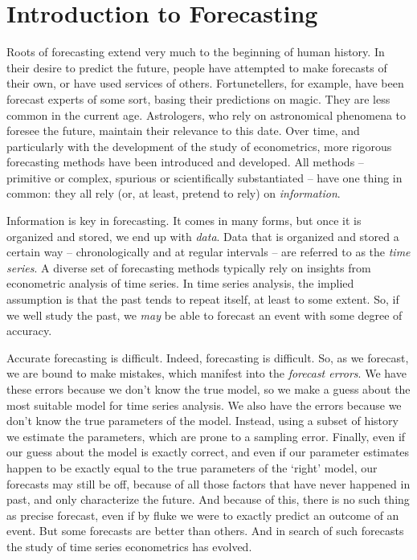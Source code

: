 \documentclass[
  12pt,
  oneside]{book}
\begin{document}
\hypertarget{introduction-to-forecasting}{%
\chapter{Introduction to Forecasting}\label{introduction-to-forecasting}}

Roots of forecasting extend very much to the beginning of human history. In their desire to predict the future, people have attempted to make forecasts of their own, or have used services of others. Fortunetellers, for example, have been forecast experts of some sort, basing their predictions on magic. They are less common in the current age. Astrologers, who rely on astronomical phenomena to foresee the future, maintain their relevance to this date. Over time, and particularly with the development of the study of econometrics, more rigorous forecasting methods have been introduced and developed. All methods -- primitive or complex, spurious or scientifically substantiated -- have one thing in common: they all rely (or, at least, pretend to rely) on \emph{information}.

Information is key in forecasting. It comes in many forms, but once it is organized and stored, we end up with \emph{data}. Data that is organized and stored a certain way -- chronologically and at regular intervals -- are referred to as the \emph{time series}. A diverse set of forecasting methods typically rely on insights from econometric analysis of time series. In time series analysis, the implied assumption is that the past tends to repeat itself, at least to some extent. So, if we well study the past, we \emph{may} be able to forecast an event with some degree of accuracy.

Accurate forecasting is difficult. Indeed, forecasting is difficult. So, as we forecast, we are bound to make mistakes, which manifest into the \emph{forecast errors}. We have these errors because we don't know the true model, so we make a guess about the most suitable model for time series analysis. We also have the errors because we don't know the true parameters of the model. Instead, using a subset of history we estimate the parameters, which are prone to a sampling error. Finally, even if our guess about the model is exactly correct, and even if our parameter estimates happen to be exactly equal to the true parameters of the `right' model, our forecasts may still be off, because of all those factors that have never happened in past, and only characterize the future. And because of this, there is no such thing as precise forecast, even if by fluke we were to exactly predict an outcome of an event. But some forecasts are better than others. And in search of such forecasts the study of time series econometrics has evolved.
\end{document}
